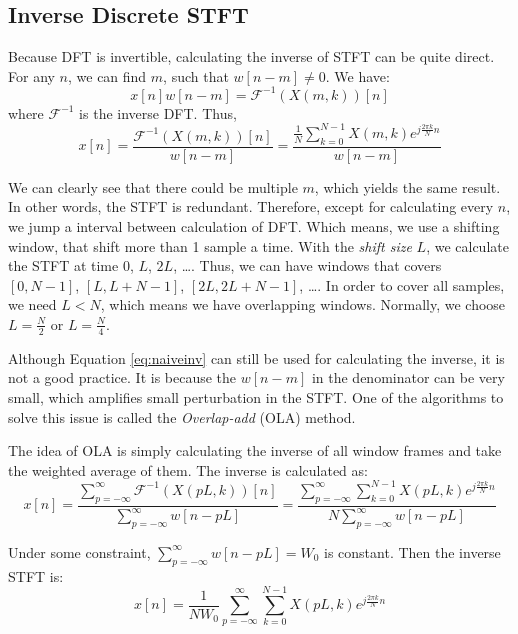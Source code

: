 \documentclass[11pt,a4paper]{report}
\begin{document}
\subsection{Inverse Discrete STFT}
Because DFT is invertible, calculating the inverse of STFT can be quite direct. For any $n$, we can find $m$, such that $w[n-m] \neq 0$. We have:
\[ x[n]w[n-m] = \mathcal{F}^{-1}(X(m,k))[n] \]
where $\mathcal{F}^{-1}$ is the inverse DFT. Thus,
\begin{equation}
  x[n] =  \frac{\mathcal{F}^{-1}(X(m,k))[n]}{w[n-m]} = \frac{\frac{1}{N}\sum_{k=0}^{N-1} X(m,k)e^{j \frac{2\pi k}{N} n}}{w[n-m]}
  \label{eq:naiveinv}
\end{equation}

We can clearly see that there could be multiple $m$, which yields the same result. In other words, the STFT is redundant. Therefore, except for calculating every $n$, we jump a interval between calculation of DFT. Which means, we use a shifting window, that shift more than 1 sample a time. With the \textit{shift size} $L$, we calculate the STFT at time $0$, $L$, $2L$, \dots. Thus, we can have windows that covers $[0, N-1]$, $[L, L+N-1]$, $[2L, 2L+N-1]$, \dots. In order to cover all samples, we need $L<N$, which means we have overlapping windows. Normally, we choose $L = \frac{N}{2}$ or $L = \frac{N}{4}$.

Although Equation \ref{eq:naiveinv} can still be used for calculating the inverse, it is not a good practice. It is because the $w[n-m]$ in the denominator can be very small, which amplifies small perturbation in the STFT. One of the algorithms to solve this issue is called the \textit{Overlap-add} (OLA) method.

The idea of OLA is simply calculating the inverse of all window frames and take the weighted average of them. The inverse is calculated as:
\begin{equation}
  x[n] = \frac{\sum_{p=-\infty}^{\infty} \mathcal{F}^{-1}(X(pL,k))[n]}{\sum_{p=-\infty}^{\infty} w[n-pL]}
  = \frac{\sum_{p=-\infty}^{\infty} \sum_{k=0}^{N-1} X(pL,k)e^{j \frac{2\pi k}{N} n}}{N\sum_{p=-\infty}^{\infty} w[n-pL]}
\end{equation}

Under some constraint, $\sum_{p=-\infty}^{\infty} w[n-pL] = W_0$ is constant. Then the inverse STFT is:
\begin{equation}
  x[n] = \frac{1}{NW_0} \sum_{p=-\infty}^{\infty} \sum_{k=0}^{N-1} X(pL,k)e^{j \frac{2\pi k}{N} n} 
  \label{eq:olainv}
\end{equation}
\end{document}
